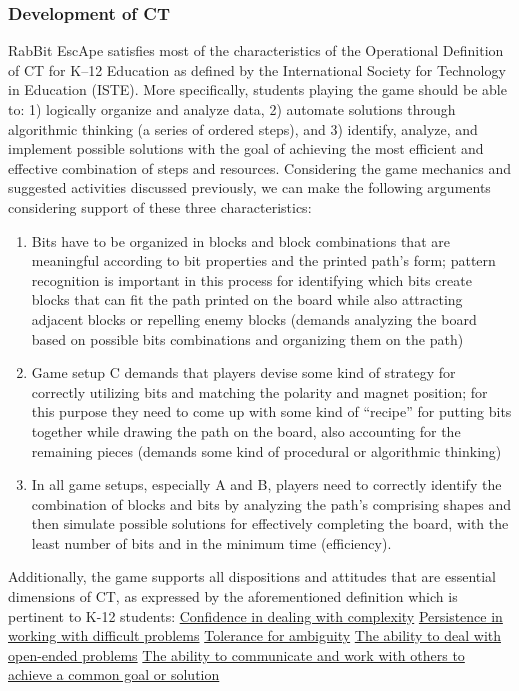 \documentclass{acm_proc_article-sp}
\begin{document}
\subsubsection{Development of CT}
RabBit EscApe satisfies most of the characteristics of the Operational Definition of CT for K–12 Education as defined by the International Society for Technology in Education (ISTE). More specifically, students playing the game should be able to: 1) logically organize and analyze data, 2) automate solutions through algorithmic thinking (a series of ordered steps), and 3) identify, analyze, and implement possible solutions with the goal of achieving the most efficient and effective combination of steps and resources. Considering the game mechanics and suggested activities discussed previously, we can make the following arguments considering support of these three characteristics:

\begin{enumerate}
\item{Bits have to be organized in blocks and block combinations that are meaningful according to bit properties and the printed path’s form; pattern recognition is important in this process for identifying which bits create blocks that can fit the path printed on the board while also attracting adjacent blocks or repelling enemy blocks (demands analyzing the board based on possible bits combinations and organizing them on the path)}
\item{Game setup C demands that players devise some kind of strategy for correctly utilizing bits and matching the polarity and magnet position; for this purpose they need to come up with some kind of “recipe” for putting bits together while drawing the path on the board, also accounting for the remaining pieces (demands some kind of procedural or algorithmic thinking)}
\item{In all game setups, especially A and B, players need to correctly identify the combination of blocks and bits by analyzing the path’s comprising shapes and then simulate possible solutions for effectively completing the board, with the least number of bits and in the minimum time (efficiency).}
\end{enumerate}

Additionally, the game supports all dispositions and attitudes that are essential dimensions of CT, as expressed by the aforementioned definition which is pertinent to K-12 students:
\ul{Confidence in dealing with complexity}
\ul{Persistence in working with difficult problems}
\ul{Tolerance for ambiguity}
\ul{The ability to deal with open-ended problems}
\ul{The ability to communicate and work with others to achieve a common goal or solution}
\end{document}
